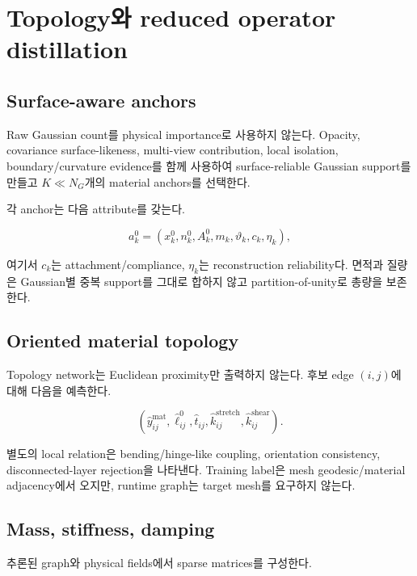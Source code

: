 \documentclass[11pt,a4paper]{article}
\begin{document}
\section{Topology와 reduced operator distillation}

\subsection{Surface-aware anchors}

Raw Gaussian count를 physical importance로 사용하지 않는다.
Opacity, covariance surface-likeness, multi-view contribution,
local isolation, boundary/curvature evidence를 함께 사용하여
surface-reliable Gaussian support를 만들고 \(K\ll N_G\)개의 material anchors를 선택한다.

각 anchor는 다음 attribute를 갖는다.

\begin{equation}
  a_k^0
  =
  \left(
  x_k^0,n_k^0,A_k^0,m_k,
  \vartheta_k,c_k,\eta_k
  \right),
\end{equation}

여기서 \(c_k\)는 attachment/compliance,
\(\eta_k\)는 reconstruction reliability다.
면적과 질량은 Gaussian별 중복 support를 그대로 합하지 않고
partition-of-unity로 총량을 보존한다.

\subsection{Oriented material topology}

Topology network는 Euclidean proximity만 출력하지 않는다.
후보 edge \((i,j)\)에 대해 다음을 예측한다.

\begin{equation}
  (\widehat y_{ij}^{\mathrm{mat}},
   \widehat \ell_{ij}^0,
   \widehat t_{ij},
   \widehat k_{ij}^{\mathrm{stretch}},
   \widehat k_{ij}^{\mathrm{shear}}).
\end{equation}

별도의 local relation은 bending/hinge-like coupling,
orientation consistency, disconnected-layer rejection을 나타낸다.
Training label은 mesh geodesic/material adjacency에서 오지만,
runtime graph는 target mesh를 요구하지 않는다.

\subsection{Mass, stiffness, damping}

추론된 graph와 physical fields에서 sparse matrices를 구성한다.
\end{document}
